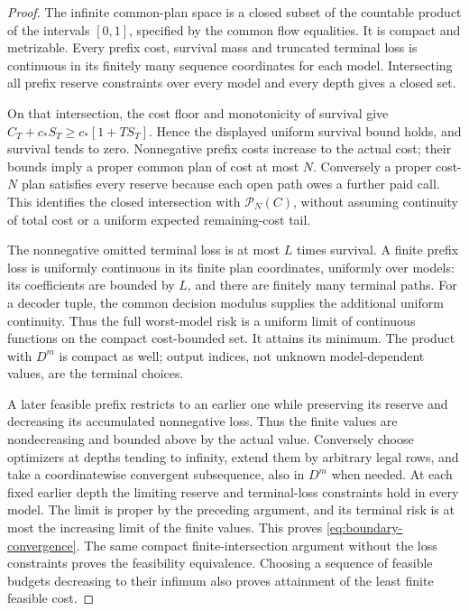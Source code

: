 \begin{proof}
The infinite common-plan space is a closed subset of the countable product of the intervals $[0,1]$, specified by the common flow equalities. It is compact and metrizable. Every prefix cost, survival mass and truncated terminal loss is continuous in its finitely many sequence coordinates for each model. Intersecting all prefix reserve constraints over every model and every depth gives a closed set.

On that intersection, the cost floor and monotonicity of survival give
$C_T+c_*S_T\ge c_*[1+T S_T]$. Hence the displayed uniform survival bound holds, and survival tends to zero. Nonnegative prefix costs increase to the actual cost; their bounds imply a proper common plan of cost at most $N$. Conversely a proper cost-$N$ plan satisfies every reserve because each open path owes a further paid call. This identifies the closed intersection with $\mathcal P_N(C)$, without assuming continuity of total cost or a uniform expected remaining-cost tail.

The nonnegative omitted terminal loss is at most $L$ times survival. A finite prefix loss is uniformly continuous in its finite plan coordinates, uniformly over models: its coefficients are bounded by $L$, and there are finitely many terminal paths. For a decoder tuple, the common decision modulus supplies the additional uniform continuity. Thus the full worst-model risk is a uniform limit of continuous functions on the compact cost-bounded set. It attains its minimum. The product with $D^m$ is compact as well; output indices, not unknown model-dependent values, are the terminal choices.

A later feasible prefix restricts to an earlier one while preserving its reserve and decreasing its accumulated nonnegative loss. Thus the finite values are nondecreasing and bounded above by the actual value. Conversely choose optimizers at depths tending to infinity, extend them by arbitrary legal rows, and take a coordinatewise convergent subsequence, also in $D^m$ when needed. At each fixed earlier depth the limiting reserve and terminal-loss constraints hold in every model. The limit is proper by the preceding argument, and its terminal risk is at most the increasing limit of the finite values. This proves \eqref{eq:boundary-convergence}. The same compact finite-intersection argument without the loss constraints proves the feasibility equivalence. Choosing a sequence of feasible budgets decreasing to their infimum also proves attainment of the least finite feasible cost.


\end{proof}
